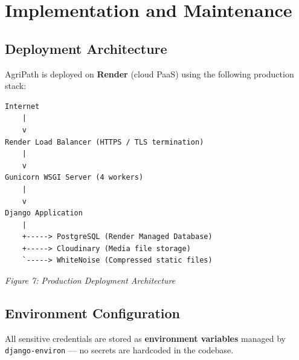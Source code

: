 \documentclass[12pt,a4paper]{article}
\begin{document}
\section{Implementation and Maintenance}

\subsection*{Deployment Architecture}

AgriPath is deployed on \textbf{Render} (cloud PaaS) using the following production stack:

\begin{Verbatim}[fontsize=\small, frame=single]
Internet
    |
    v
Render Load Balancer (HTTPS / TLS termination)
    |
    v
Gunicorn WSGI Server (4 workers)
    |
    v
Django Application
    |
    +-----> PostgreSQL (Render Managed Database)
    +-----> Cloudinary (Media file storage)
    `-----> WhiteNoise (Compressed static files)
\end{Verbatim}
\begin{center}
\textit{Figure 7: Production Deployment Architecture}
\end{center}

\subsection*{Environment Configuration}

All sensitive credentials are stored as \textbf{environment variables} managed by \texttt{django-environ} --- no secrets are hardcoded in the codebase.
\end{document}
